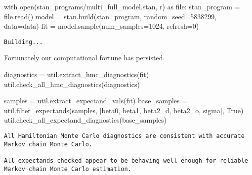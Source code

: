 \documentclass[
  letterpaper,
  DIV=11,
  numbers=noendperiod]{scrartcl}
\newenvironment{Shaded}{\begin{snugshade}}{\end{snugshade}}
\newcommand{\BuiltInTok}[1]{\textcolor[rgb]{0.00,0.23,0.31}{#1}}
\newcommand{\ControlFlowTok}[1]{\textcolor[rgb]{0.00,0.23,0.31}{#1}}
\newcommand{\DecValTok}[1]{\textcolor[rgb]{0.68,0.00,0.00}{#1}}
\newcommand{\ImportTok}[1]{\textcolor[rgb]{0.00,0.46,0.62}{#1}}
\newcommand{\NormalTok}[1]{\textcolor[rgb]{0.00,0.23,0.31}{#1}}
\newcommand{\OperatorTok}[1]{\textcolor[rgb]{0.37,0.37,0.37}{#1}}
\newcommand{\StringTok}[1]{\textcolor[rgb]{0.13,0.47,0.30}{#1}}
\newcommand{\VariableTok}[1]{\textcolor[rgb]{0.07,0.07,0.07}{#1}}
\begin{document}
\begin{Shaded}
\begin{Highlighting}[]
\ControlFlowTok{with} \BuiltInTok{open}\NormalTok{(}\StringTok{\textquotesingle{}stan\_programs/multi\_full\_model.stan\textquotesingle{}}\NormalTok{, }\StringTok{\textquotesingle{}r\textquotesingle{}}\NormalTok{) }\ImportTok{as} \BuiltInTok{file}\NormalTok{:}
\NormalTok{  stan\_program }\OperatorTok{=} \BuiltInTok{file}\NormalTok{.read()}
\NormalTok{model }\OperatorTok{=}\NormalTok{ stan.build(stan\_program, random\_seed}\OperatorTok{=}\DecValTok{5838299}\NormalTok{, data}\OperatorTok{=}\NormalTok{data)}
\NormalTok{fit }\OperatorTok{=}\NormalTok{ model.sample(num\_samples}\OperatorTok{=}\DecValTok{1024}\NormalTok{, refresh}\OperatorTok{=}\DecValTok{0}\NormalTok{)}
\end{Highlighting}
\end{Shaded}

\begin{verbatim}
Building...
\end{verbatim}

Fortunately our computational fortune has persisted.

\begin{Shaded}
\begin{Highlighting}[]
\NormalTok{diagnostics }\OperatorTok{=}\NormalTok{ util.extract\_hmc\_diagnostics(fit)}
\NormalTok{util.check\_all\_hmc\_diagnostics(diagnostics)}

\NormalTok{samples }\OperatorTok{=}\NormalTok{ util.extract\_expectand\_vals(fit)}
\NormalTok{base\_samples }\OperatorTok{=}\NormalTok{ util.filter\_expectands(samples,}
\NormalTok{                                      [}\StringTok{\textquotesingle{}beta0\textquotesingle{}}\NormalTok{, }\StringTok{\textquotesingle{}beta1\textquotesingle{}}\NormalTok{,}
                                       \StringTok{\textquotesingle{}beta2\_d\textquotesingle{}}\NormalTok{, }\StringTok{\textquotesingle{}beta2\_o\textquotesingle{}}\NormalTok{,}
                                       \StringTok{\textquotesingle{}sigma\textquotesingle{}}\NormalTok{],}
                                      \VariableTok{True}\NormalTok{)}
\NormalTok{util.check\_all\_expectand\_diagnostics(base\_samples)}
\end{Highlighting}
\end{Shaded}

\begin{verbatim}
All Hamiltonian Monte Carlo diagnostics are consistent with accurate
Markov chain Monte Carlo.
 
All expectands checked appear to be behaving well enough for reliable
Markov chain Monte Carlo estimation.
 
\end{verbatim}
\end{document}
